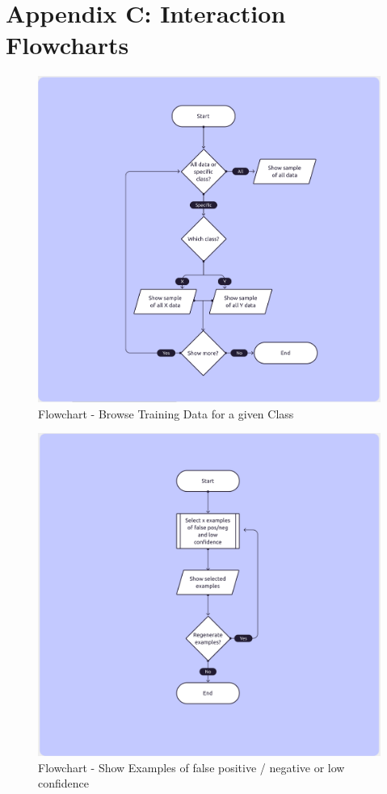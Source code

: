 \section*{Appendix C: Interaction Flowcharts}\label{appendix:interaction_flowcharts}
\begin{figure}[htbp]
    \centering
    \includegraphics[width=\textwidth]{img/figures/flowcharts/browse_train_data_for_chosen_class.png}
    \caption{Flowchart - Browse Training Data for a given Class}
    \label{figure:flowchart_browse_data}
\end{figure}
\begin{figure}[htbp]
    \centering
    \includegraphics[width=\textwidth]{img/figures/flowcharts/show_examples_limits.png}
    \caption{Flowchart - Show Examples of false positive / negative or low confidence}
    \label{figure:flowchart_show_examples_limits}
\end{figure}
